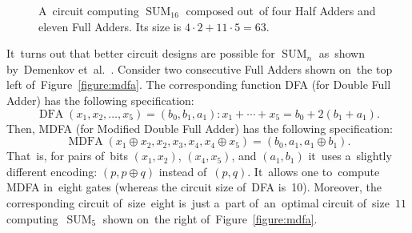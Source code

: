 \documentclass[sigconf, review, anonymous]{acmart}
\DeclareMathOperator{\SUM}{SUM}
\DeclareMathOperator{\MDFA}{MDFA}
\begin{document}
\begin{figure}
    \begin{center}
    \end{center}
    \caption{A~circuit computing $\SUM_{16}$ composed out~of four Half Adders and eleven Full Adders. Its size is $4 \cdot 2 + 11 \cdot 5=63$.}
    \label{figure:sum17fa}
\end{figure}

It~turns out that better circuit designs are possible for $\SUM_n$
as~shown by~Demenkov et~al.~\cite{DBLP:journals/ipl/DemenkovKKY10}.
Consider two consecutive Full Adders shown on~the top left of~Figure~\ref{figure:mdfa}. The corresponding function DFA (for Double Full Adder) has the following specification: \[\operatorname{DFA}(x_1, x_2,\dotsc,x_5)=(b_0,b_1,a_1) \colon x_1+\dotsb+x_5=b_0+2(b_1+a_1).\]
Then, MDFA (for Modified Double Full Adder) has the following specification:
\[\MDFA(x_1 \oplus x_2, x_2, x_3, x_4, x_4 \oplus x_5)=(b_0, a_1, a_1 \oplus b_1).\]
That~is, for pairs of~bits $(x_1, x_2)$, $(x_4, x_5)$, and $(a_1, b_1)$
it~uses a~slightly different encoding: $(p, p \oplus q)$ instead of~$(p,q)$.
It~allows one to~compute MDFA in~eight gates (whereas the circuit size of~DFA is~10). Moreover, the corresponding circuit of~size~eight is~just a~part
of~an~optimal circuit of~size~$11$ computing~$\SUM_5$ shown on~the right
of~Figure~\ref{figure:mdfa}.
\end{document}
